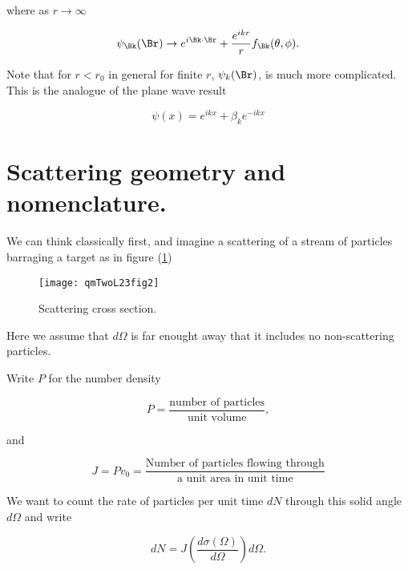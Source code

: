 where as $r \rightarrow \infty$

\begin{equation}\label{eqn:qmTwoL23:600}
\psi_\Bk(\Br) \rightarrow e^{i \Bk \cdot \Br} + \frac{e^{i k r}}{r} f_\Bk(\theta, \phi).
\end{equation}

Note that for $r < r_0$ in general for finite $r$, $\psi_k(\Br)$, is much more complicated.  This is the analogue of the plane wave result

\begin{equation}\label{eqn:qmTwoL23:620}
\psi(x) = e^{i k x} + \beta_k e^{-i k x}
\end{equation}


\section{Scattering geometry and nomenclature.}

We can think classically first, and imagine a scattering of a stream of particles barraging a target as in
figure (\ref{fig:qmTwoL23:qmTwoL23fig2})

\begin{figure}[htp]
   \centering
   \texttt{[image: qmTwoL23fig2]}
   \caption{Scattering cross section.}\label{fig:qmTwoL23:qmTwoL23fig2}
\end{figure}

Here we assume that $d\Omega$ is far enought away that it includes no non-scattering particles.

Write $P$ for the number density

\begin{equation}\label{eqn:qmTwoL23:680}
P = \frac{\text{number of particles}}{\text{unit volume}},
\end{equation}

and

\begin{equation}\label{eqn:qmTwoL23:700}
J = P v_0 =
\frac{
\text{Number of particles flowing through}
}{
\text{a unit area in unit time}
}
\end{equation}

We want to count the rate of particles per unit time $dN$ through this solid angle $d\Omega$ and write

\begin{equation}\label{eqn:qmTwoL23:720}
dN = J \left( \frac{d \sigma(\Omega)}{d\Omega} \right) d\Omega.
\end{equation}

